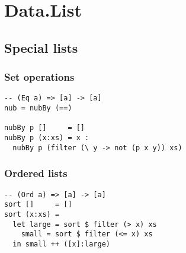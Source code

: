 \section{Data.List}
\subsection{Special lists}
\subsubsection{Set operations}
\begin{verbatim}
-- (Eq a) => [a] -> [a]
nub = nubBy (==)

nubBy p []     = []
nubBy p (x:xs) = x : 
  nubBy p (filter (\ y -> not (p x y)) xs)
\end{verbatim}

\subsubsection{Ordered lists}
\begin{verbatim}
-- (Ord a) => [a] -> [a]  
sort []     = []  
sort (x:xs) =   
  let large = sort $ filter (> x) xs
    small = sort $ filter (<= x) xs
  in small ++ ([x]:large)
\end{verbatim}